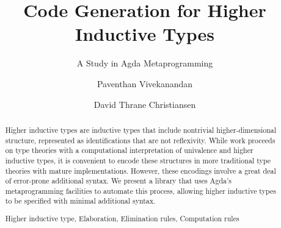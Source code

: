 \documentclass[runningheads]{llncs}
\newcommand{\keywords}[1]{\par\addvspace\baselineskip
\noindent\keywordname\enspace\ignorespaces#1}
\begin{document}
\mainmatter  %

\title{Code Generation for Higher Inductive Types}
\subtitle{A Study in Agda Metaprogramming}


\author{Paventhan Vivekanandan \and
David Thrane Christiansen}
%
%


%
%

%


%
%

\maketitle


\begin{abstract}
Higher inductive types are inductive types that include nontrivial higher-dimensional structure, represented as identifications that are not reflexivity. While work proceeds on type theories with a computational interpretation of univalence and higher inductive types, it is convenient to encode these structures in more traditional type theories with mature implementations. However, these encodings involve a great deal of error-prone additional syntax. We present a library that uses Agda's metaprogramming facilities to automate this process, allowing higher inductive types to be specified with minimal additional syntax.
\keywords{Higher inductive type, Elaboration, Elimination rules, Computation rules}
\end{abstract}
\end{document}
